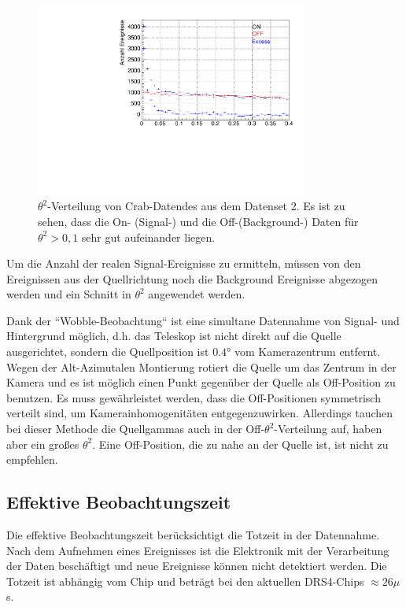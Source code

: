 \begin{figure}
    \centering
    \includegraphics[width=0.8\textwidth]{./Plots/04_MrkAnalyse/Datenset2/Crab_Theta2.pdf}
    \caption{$\theta^2$-Verteilung von Crab-Datendes aus dem Datenset 2. Es ist zu sehen, dass die On- (Signal-) und die Off-(Background-) Daten für $\theta^2 > 0,1$ sehr gut aufeinander liegen.}
    \label{Disp}
\end{figure}

Um die Anzahl der realen Signal-Ereignisse zu ermitteln, müssen von den Ereignissen aus der Quellrichtung noch die Background Ereignisse abgezogen werden und ein Schnitt in $\theta^2$ angewendet werden.

Dank der ``Wobble-Beobachtung`` ist eine simultane Datennahme von Signal- und Hintergrund möglich, d.h. das Teleskop ist nicht direkt auf die Quelle ausgerichtet, sondern die Quellposition ist $0.4°$ vom Kamerazentrum entfernt.
Wegen der Alt-Azimutalen Montierung rotiert die Quelle um das Zentrum in der Kamera und es ist möglich einen Punkt gegenüber der Quelle als Off-Position zu benutzen.
Es muss gewährleistet werden, dass die Off-Positionen symmetrisch verteilt sind, um Kamerainhomogenitäten entgegenzuwirken.
Allerdings tauchen bei dieser Methode die Quellgammas auch in der Off-$\theta^2$-Verteilung auf, haben aber ein großes $\theta^2$.
Eine Off-Position, die zu nahe an der Quelle ist, ist nicht zu empfehlen.

\subsection{Effektive Beobachtungszeit}
Die effektive Beobachtungszeit berücksichtigt die Totzeit in der Datennahme.
Nach dem Aufnehmen eines Ereignisses ist die Elektronik mit der Verarbeitung der Daten beschäftigt und neue Ereignisse können nicht detektiert werden.
Die Totzeit ist abhängig vom Chip und beträgt bei den aktuellen DRS4-Chips $\approx 26\mu$s.

